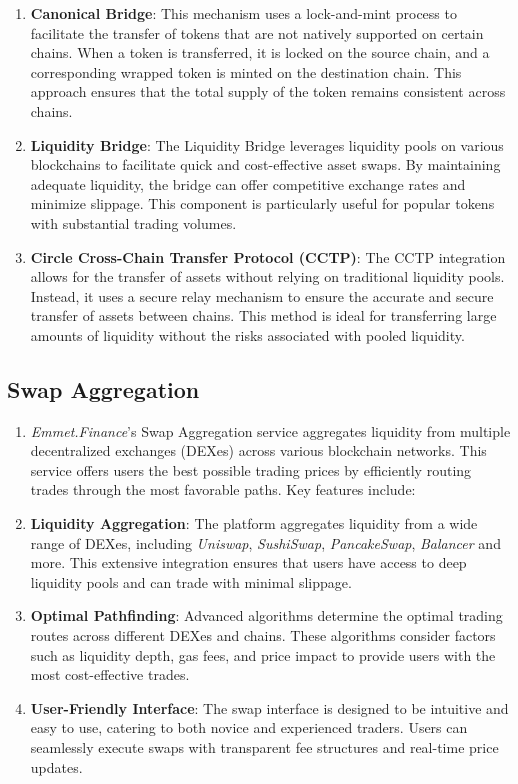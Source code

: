 \documentclass[12pt, a4paper]{article}
\begin{document}
\begin{enumerate}
    \item \textbf{Canonical Bridge}: This mechanism uses a lock-and-mint process to facilitate the transfer of tokens that are not natively supported on certain chains. When a token is transferred, it is locked on the source chain, and a corresponding wrapped token is minted on the destination chain. This approach ensures that the total supply of the token remains consistent across chains.
    \item \textbf{Liquidity Bridge}: The Liquidity Bridge leverages liquidity pools on various blockchains to facilitate quick and cost-effective asset swaps. By maintaining adequate liquidity, the bridge can offer competitive exchange rates and minimize slippage. This component is particularly useful for popular tokens with substantial trading volumes.
    \item \textbf{Circle Cross-Chain Transfer Protocol (CCTP)}: The CCTP integration allows for the transfer of assets without relying on traditional liquidity pools. Instead, it uses a secure relay mechanism to ensure the accurate and secure transfer of assets between chains. This method is ideal for transferring large amounts of liquidity without the risks associated with pooled liquidity.
\end{enumerate}

\subsection{Swap Aggregation}

\begin{enumerate}
    \item \textit{Emmet.Finance}'s Swap Aggregation service aggregates liquidity from multiple decentralized exchanges (DEXes) across various blockchain networks. This service offers users the best possible trading prices by efficiently routing trades through the most favorable paths. Key features include:
    \item \textbf{Liquidity Aggregation}: The platform aggregates liquidity from a wide range of DEXes, including \textit{Uniswap}, \textit{SushiSwap}, \textit{PancakeSwap}, \textit{Balancer} and more. This extensive integration ensures that users have access to deep liquidity pools and can trade with minimal slippage.
    \item \textbf{Optimal Pathfinding}: Advanced algorithms determine the optimal trading routes across different DEXes and chains. These algorithms consider factors such as liquidity depth, gas fees, and price impact to provide users with the most cost-effective trades.
    \item \textbf{User-Friendly Interface}: The swap interface is designed to be intuitive and easy to use, catering to both novice and experienced traders. Users can seamlessly execute swaps with transparent fee structures and real-time price updates.
\end{enumerate}
\end{document}
